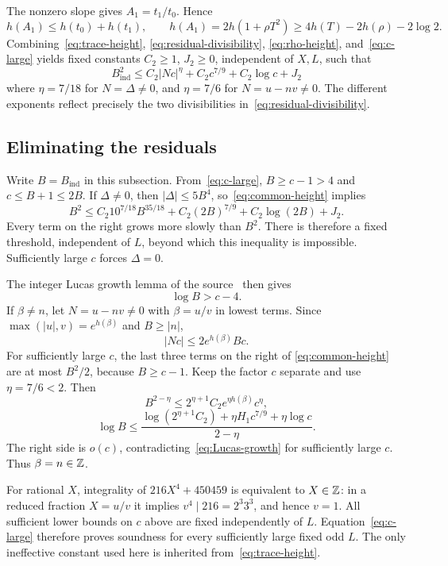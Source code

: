 \documentclass[11pt,a4paper]{article}
\begin{document}
The nonzero slope gives $A_1=t_1/t_0$. Hence
\[
 h(A_1)\le h(t_0)+h(t_1),\qquad
 h(A_1)=2h(1+\rho T^2)\ge4h(T)-2h(\rho)-2\log2.
\]
Combining~\eqref{eq:trace-height}, \eqref{eq:residual-divisibility},
\eqref{eq:rho-height}, and~\eqref{eq:c-large} yields fixed
constants $C_2\ge1$, $J_2\ge0$, independent of $X,L$, such that
\begin{equation}\label{eq:common-height}
 B_{\mathrm{ind}}^2\le C_2|Nc|^{\eta}
             +C_2c^{7/9}+C_2\log c+J_2
\end{equation}
where $\eta=7/18$ for $N=\Delta\ne0$, and $\eta=7/6$
for $N=u-nv\ne0$. The different exponents reflect precisely the
two divisibilities in~\eqref{eq:residual-divisibility}.

\subsection{Eliminating the residuals}

Write $B=B_{\mathrm{ind}}$ in this subsection. From~\eqref{eq:c-large},
$B\ge c-1>4$ and $c\le B+1\le2B$. If $\Delta\ne0$, then
$|\Delta|\le5B^4$, so~\eqref{eq:common-height} implies
\[
 B^2\le C_2 10^{7/18}B^{35/18}
       +C_2(2B)^{7/9}+C_2\log(2B)+J_2.
\]
Every term on the right grows more slowly than $B^2$. There is
therefore a fixed threshold, independent of $L$, beyond which this
inequality is impossible. Sufficiently large $c$ forces
$\Delta=0$.

The integer Lucas growth lemma of the source~\cite{PointSource}
then gives
\begin{equation}\label{eq:Lucas-growth}
                              \log B>c-4.
\end{equation}
If $\beta\ne n$, let $N=u-nv\ne0$ with $\beta=u/v$ in lowest
terms. Since $\max(|u|,v)=e^{h(\beta)}$ and $B\ge|n|$,
\[
                         |Nc|\le2e^{h(\beta)}Bc.
\]
For sufficiently large $c$, the last three terms on the right of
\eqref{eq:common-height} are at most $B^2/2$, because $B\ge c-1$.
Keep the factor $c$ separate and use $\eta=7/6<2$. Then
\[
 B^{2-\eta}\le2^{\eta+1}C_2 e^{\eta h(\beta)}c^\eta,
\]
\[
 \log B\le\frac{\log(2^{\eta+1}C_2)+\eta H_1c^{7/9}
                              +\eta\log c}{2-\eta}.
\]
The right side is $o(c)$, contradicting~\eqref{eq:Lucas-growth}
for sufficiently large $c$. Thus $\beta=n\in\mathbb Z$.

For rational $X$, integrality of $216X^4+450459$ is equivalent
to $X\in\mathbb Z$: in a reduced fraction $X=u/v$ it implies
$v^4\mid216=2^3 3^3$, and hence $v=1$.
All sufficient lower bounds on $c$ above are fixed independently
of $L$. Equation~\eqref{eq:c-large} therefore proves soundness
for every sufficiently large fixed odd $L$. The only ineffective
constant used here is inherited from~\eqref{eq:trace-height}.
\end{document}
